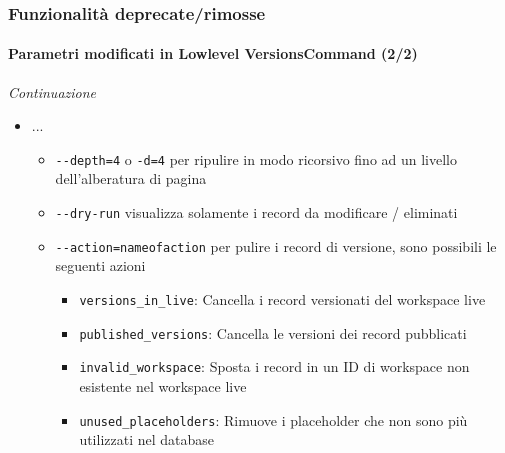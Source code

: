 \begin{frame}[fragile]
	\frametitle{Funzionalità deprecate/rimosse}
	\framesubtitle{Parametri modificati in Lowlevel VersionsCommand (2/2)}

	\small\textit{Continuazione}\normalsize

	\begin{itemize}
		\item ...
			\begin{itemize}
				\item \texttt{-}\texttt{-depth=4} o \texttt{-d=4} per ripulire in modo ricorsivo fino ad un livello dell'alberatura di pagina
				\item \texttt{-}\texttt{-dry-run} visualizza solamente i record da modificare / eliminati
				\item \texttt{-}\texttt{-action=nameofaction} per pulire i record di versione,
					sono possibili le seguenti azioni
					\begin{itemize}
						\item \texttt{versions\_in\_live}: Cancella i record versionati del workspace live
						\item \texttt{published\_versions}: Cancella le versioni dei record pubblicati
						\item \texttt{invalid\_workspace}: Sposta i record in un ID di workspace non esistente nel workspace live 
						\item \texttt{unused\_placeholders}: Rimuove i placeholder che non sono più utilizzati nel database
					\end{itemize}
			\end{itemize}
	\end{itemize}

\end{frame}


